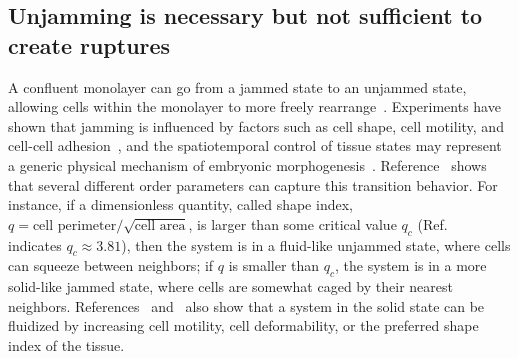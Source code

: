 \subsection{Unjamming is necessary but not sufficient to create ruptures}
\label{sec:ch2:jamming}

A confluent monolayer can go from a jammed state to an unjammed state, allowing cells within the monolayer to more freely rearrange~\cite{mitchel2020unjamming, park2015unjamming}.
Experiments have shown that jamming is influenced by factors such as cell shape, cell motility, and cell-cell adhesion~\cite{park2015unjamming, malinverno2017endocytic, lawson2021jamming}, and the spatiotemporal control of tissue states may represent a generic physical mechanism of embryonic morphogenesis~\cite{mongera2018fluid}.
Reference~\cite{loewe2020solid} shows that several different order parameters can capture this transition behavior.
For instance, if a dimensionless quantity, called shape index, $q=\text{cell perimeter}/\sqrt{\text{cell area}}$, is larger than some critical value $q_c$ (Ref.~\cite{bi2016motility} indicates $q_c\approx 3.81$), then the system is in a fluid-like unjammed state, where cells can squeeze between neighbors; if $q$ is smaller than $q_c$, the system is in a more solid-like jammed state, where cells are somewhat caged by their nearest neighbors.
References~\cite{loewe2020solid} and~\cite{bi2016motility} also show that a system in the solid state can be fluidized by increasing cell motility, cell deformability, or the preferred shape index of the tissue.

